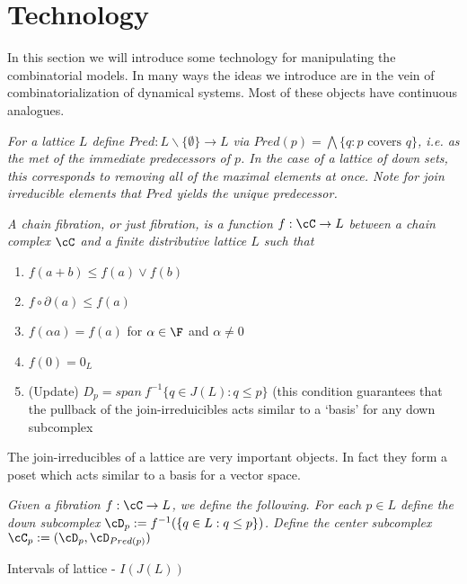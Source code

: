 


\section{Technology}

In this section we will introduce some technology for manipulating the combinatorial models.  In many ways the ideas we introduce are in the vein of combinatorialization of dynamical systems.  Most of these objects have continuous analogues.


\begin{defn}
{\em
For a lattice $L$ define $Pred:L\backslash \{\emptyset\} \to L$ via $Pred(p) = \bigwedge \{q: \text{$p$ covers $q$}\}$, i.e. as the met of the immediate predecessors of $p$.  In the case of a lattice of down sets, this corresponds to removing all of the maximal elements at once.  Note for join irreducible elements that $Pred$ yields the unique predecessor.
}
\end{defn}



\begin{defn}
{\em
A {\em chain fibration}, or just {\em fibration}, is a function $f:\cC\to L$ between a chain complex $\cC$ and a finite distributive lattice $L$ such that
\begin{enumerate}
\item $f(a+ b) \leq f(a)\vee f(b)$

\item $f\circ \partial(a) \leq f(a)$

\item $f(\alpha a) = f(a)$ for $\alpha\in \F$ and $\alpha \neq 0$ 

\item $f(0) = 0_L$

\item (Update) $D_p = span~f^{-1}\{q\in J(L):q\leq p\}$ (this condition guarantees that the pullback of the join-irreduicibles acts similar to a `basis' for any down subcomplex

\end{enumerate}
}
\end{defn}

The join-irreducibles of a lattice are very important objects.  In fact they form a poset which acts similar to a basis for a vector space.

\begin{defn}
{\em
Given a fibration $f:\cC\to L$, we define the following.  For each $p\in L$ define the {\em down subcomplex} $\cD_p := f^{-1}(\{q\in L: q \leq p\})$.  Define the {\em center subcomplex} $\cC_p:= (\cD_p,\cD_{Pred(p)})$
}
\end{defn}
\begin{defn}
Intervals of lattice - $I(J(L))$
\end{defn}


